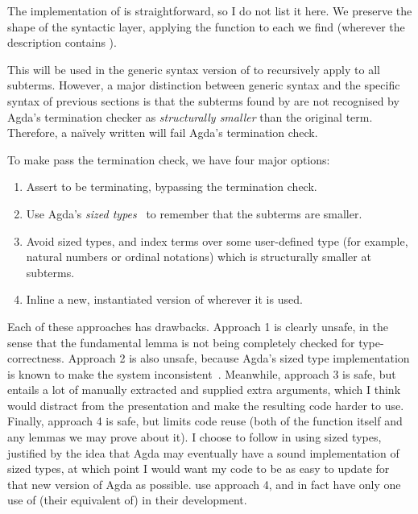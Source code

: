 
The implementation of  is straightforward, so I do not list
it here.
We preserve
the shape of the syntactic layer, applying the function to each 
we find (wherever the description contains \AgdaInductiveConstructor{$\langle$}%
\AgdaSpace{}\AgdaBound{$\Delta$}\AgdaSpace{}%
\AgdaSpace{}\AgdaSpace{}%
\AgdaInductiveConstructor{$\rangle$}).

This  will be used in the generic syntax version of
 to recursively apply  to all subterms.
However, a major distinction between generic syntax and the specific syntax of
previous sections is that the subterms found by  are not
recognised by Agda's termination checker as \emph{structurally smaller} than
the original term.
Therefore, a na\"{i}vely written  will fail Agda's termination
check.

To make  pass the termination check, we have four major
options:
\begin{enumerate}
  \item Assert  to be terminating, bypassing the termination
    check.
  \item Use Agda's \emph{sized types}~\citep{Abel10} to remember that the
    subterms are smaller.
  \item Avoid sized types, and index terms over some user-defined type (for
    example, natural numbers or ordinal notations) which is structurally smaller
    at subterms.
  \item Inline a new, instantiated version of  wherever it
    is used.
\end{enumerate}

Each of these approaches has drawbacks.
Approach 1 is clearly unsafe, in the sense that the fundamental lemma
 is not being completely checked for type-correctness.
Approach 2 is also unsafe, because Agda's sized type implementation is known to
make the system inconsistent~\citep{AgdaIssue1201}.
Meanwhile, approach 3 is safe, but entails a lot of manually extracted and
supplied extra arguments, which I think would distract from the presentation and
make the resulting code harder to use.
Finally, approach 4 is safe, but limits code reuse (both of the function
 itself and any lemmas we may prove about it).
I choose to follow \citet{AACMM21} in using sized types, justified by the idea
that Agda may eventually have a sound implementation of sized types, at which
point I would want my code to be as easy to update for that new version of Agda
as possible.
 use approach 4, and in fact have only one use of (their equivalent
of)  in their development.

